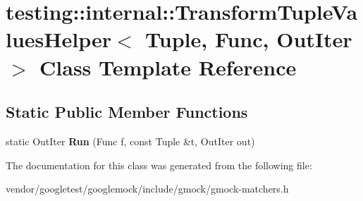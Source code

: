 \hypertarget{classtesting_1_1internal_1_1_transform_tuple_values_helper}{}\section{testing\+:\+:internal\+:\+:Transform\+Tuple\+Values\+Helper$<$ Tuple, Func, Out\+Iter $>$ Class Template Reference}
\label{classtesting_1_1internal_1_1_transform_tuple_values_helper}
\subsection*{Static Public Member Functions}
\begin{DoxyCompactItemize}
\item 
\mbox{\label{classtesting_1_1internal_1_1_transform_tuple_values_helper_a27773f284f43c712ec72923a872d35fc}} 
static Out\+Iter {\bfseries Run} (Func f, const Tuple \&t, Out\+Iter out)
\end{DoxyCompactItemize}


The documentation for this class was generated from the following file\+:\begin{DoxyCompactItemize}
\item 
vendor/googletest/googlemock/include/gmock/gmock-\/matchers.\+h\end{DoxyCompactItemize}
